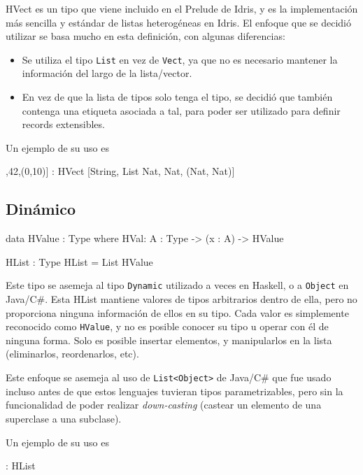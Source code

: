 HVect es un tipo que viene incluido en el Prelude de Idris, y es la implementación más sencilla y estándar de listas heterogéneas en Idris. El enfoque que se decidió utilizar se basa mucho en esta definición, con algunas diferencias:
\begin{itemize}[noitemsep]
\item Se utiliza el tipo \texttt{List} en vez de \texttt{Vect}, ya que no es necesario mantener la información del largo de la lista/vector.
\item En vez de que la lista de tipos solo tenga el tipo, se decidió que también contenga una etiqueta asociada a tal, para poder ser utilizado para definir records extensibles.
\end{itemize}

Un ejemplo de su uso es 

\begin{code}
["Hello",[1,2,3],42,(0,10)] : 
    HVect [String, List Nat, Nat, (Nat, Nat)]
\end{code}

\subsection{Dinámico}

\begin{code}
data HValue : Type where
    HVal: {A : Type} -> (x : A) -> HValue

HList : Type
HList = List HValue 
\end{code}

Este tipo se asemeja al tipo \texttt{Dynamic} utilizado a veces en Haskell, o a \texttt{Object} en Java/C\#. Esta HList mantiene valores de tipos arbitrarios dentro de ella, pero no proporciona ninguna información de ellos en su tipo. Cada valor es simplemente reconocido como \texttt{HValue}, y no es posible conocer su tipo u operar con él de ninguna forma. Solo es posible insertar elementos, y manipularlos en la lista (eliminarlos, reordenarlos, etc).

Este enfoque se asemeja al uso de \texttt{List<Object>} de Java/C\# que fue usado incluso antes de que estos lenguajes tuvieran tipos parametrizables, pero sin la funcionalidad de poder realizar \textit{down-casting} (castear un elemento de una superclase a una subclase).

Un ejemplo de su uso es 

\begin{code}
 : HList
\end{code}

